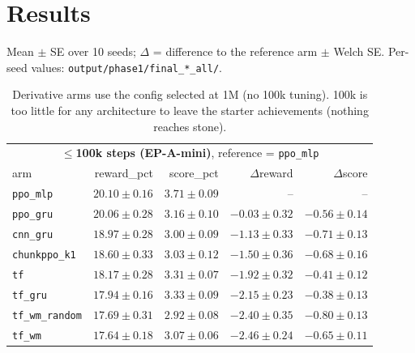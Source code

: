 \documentclass[10pt]{article}
\newcommand{\p}[1]{\texttt{\small #1}}
\begin{document}
\section*{Results}
Mean $\pm$ SE over 10 seeds; $\Delta$ = difference to the reference arm $\pm$ Welch SE. Per-seed values: \p{output/phase1/final\_*\_all/}.

\begin{table}[h]\centering\small
\begin{tabular}{@{}lrrrr@{}}\toprule
\multicolumn{5}{c}{\textbf{$\le$100k steps (EP-A-mini)}, reference = \p{ppo\_mlp}}\\
arm & reward\_pct & score\_pct & $\Delta$reward & $\Delta$score\\\midrule
\p{ppo\_mlp}   & $20.10\pm0.16$ & $3.71\pm0.09$ & -- & --\\
\p{ppo\_gru}   & $20.06\pm0.28$ & $3.16\pm0.10$ & $-0.03\pm0.32$ & $-0.56\pm0.14$\\
\p{cnn\_gru}   & $18.97\pm0.28$ & $3.00\pm0.09$ & $-1.13\pm0.33$ & $-0.71\pm0.13$\\
\p{chunkppo\_k1} & $18.60\pm0.33$ & $3.03\pm0.12$ & $-1.50\pm0.36$ & $-0.68\pm0.16$\\
\p{tf}         & $18.17\pm0.28$ & $3.31\pm0.07$ & $-1.92\pm0.32$ & $-0.41\pm0.12$\\
\p{tf\_gru}    & $17.94\pm0.16$ & $3.33\pm0.09$ & $-2.15\pm0.23$ & $-0.38\pm0.13$\\
\p{tf\_wm\_random} & $17.69\pm0.31$ & $2.92\pm0.08$ & $-2.40\pm0.35$ & $-0.80\pm0.13$\\
\p{tf\_wm}     & $17.64\pm0.18$ & $3.07\pm0.06$ & $-2.46\pm0.24$ & $-0.65\pm0.11$\\\bottomrule
\end{tabular}
\caption*{Derivative arms use the config selected at 1M (no 100k tuning). 100k is too little for any architecture to leave the starter achievements (nothing reaches stone).}
\end{table}
\end{document}

